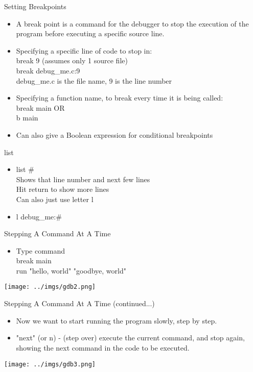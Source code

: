 \documentclass{beamer}
\begin{document}
\begin{frame}{Setting Breakpoints}
\begin{itemize}
\item A break point is a command for the debugger to stop the execution of the program before executing a specific source line. 
\item Specifying a specific line of code to stop in: \\
break 9		(assumes only 1 source file)\\
break debug\_me.c:9\\
   debug\_me.c is the file name, 9 is the line number\\
\item Specifying a function name, to break every time it is being called: \\
break main 			OR\\
b main
\item Can also give a Boolean expression for conditional breakpoints
\end{itemize}
\end{frame}

\begin{frame}{list}
\begin{itemize}
\item list \#\\
Shows that line number and next few lines\\
Hit return to show more lines\\
Can also just use letter l\\
\item l debug\_me:\#
\end{itemize}
\end{frame}

\begin{frame}{Stepping A Command At A Time}
\begin{itemize}
\item Type command\\
break main \\
run "hello, world" "goodbye, world"
\end{itemize}
\texttt{[image: ../imgs/gdb2.png]}
\end{frame}

\begin{frame}{Stepping A Command At A Time (continued...)}
\begin{itemize}
\item Now we want to start running the program slowly, step by step. 
\item "next" (or n) - (step over) execute the current command, and stop again, showing the next command in the code to be executed. 
\end{itemize}
\texttt{[image: ../imgs/gdb3.png]}
\end{frame}
\end{document}
